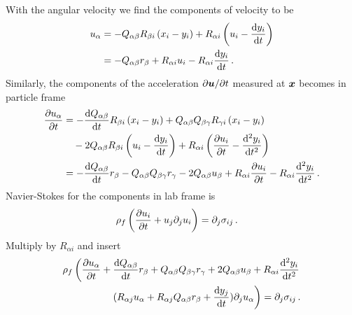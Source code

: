 \documentclass[thesis.tex]{subfiles}
\begin{document}
With the angular velocity we find the components of velocity to be
\begin{align}
    u_\alpha &= -Q_{\alpha \beta}R_{\beta i}\left(x_i - y_i\right) + R_{\alpha i}\left(u_i - \frac{\mathrm{d} y_i}{\mathrm{d} t}\right) \nonumber \\
    &= -Q_{\alpha \beta}r_\beta + R_{\alpha i}u_i - R_{\alpha i}\frac{\mathrm{d} y_i}{\mathrm{d} t}\,.
\end{align}
Similarly, the components of the acceleration $\partial \mbox{\boldmath$u$}/\partial t$ measured at $\mbox{\boldmath$x$}$ becomes in particle frame
\begin{align}
    \frac{\partial u_\alpha}{\partial t} &= -\frac{\mathrm{d} Q_{\alpha \beta}}{\mathrm{d} t}R_{\beta i}\left(x_i - y_i\right) + Q_{\alpha \beta}Q_{\beta \gamma}R_{\gamma i}\left(x_i - y_i\right) \nonumber\\
    &\quad- 2Q_{\alpha \beta}R_{\beta i}\left(u_i - \frac{\mathrm{d} y_i}{\mathrm{d} t}\right) + R_{\alpha i}\left(\frac{\partial u_i}{\partial t} - \frac{\mathrm{d}^2 y_i}{\mathrm{d} t^2}\right) \nonumber \\
    &= -\frac{\mathrm{d} Q_{\alpha \beta}}{\mathrm{d} t}r_\beta - Q_{\alpha \beta}Q_{\beta \gamma}r_\gamma - 2Q_{\alpha \beta}u_\beta + R_{\alpha i}\frac{\partial u_i}{\partial t} -R_{\alpha i}\frac{\mathrm{d}^2 y_i}{\mathrm{d} t^2}\,.
\end{align}
Navier-Stokes for the components in lab frame is
\begin{align}
    \rho_f\left(\frac{\partial u_i}{\partial t} + u_j \partial_j u_i\right) &= \partial_j \sigma_{ij}\,.
\end{align}
Multiply by $R_{\alpha i}$ and insert
\begin{align}
    \rho_f\left(\frac{\partial u_\alpha}{\partial t} + \frac{\mathrm{d} Q_{\alpha \beta}}{\mathrm{d} t}r_\beta + Q_{\alpha \beta}Q_{\beta \gamma}r_\gamma + 2Q_{\alpha \beta}u_\beta +R_{\alpha i}\frac{\mathrm{d}^2 y_i}{\mathrm{d} t^2}\right.\nonumber\\
    \left.\quad (R_{\alpha j}u_\alpha + R_{\alpha j}Q_{\alpha \beta}r_\beta + \frac{\mathrm{d} y_j}{\mathrm{d} t} ) \partial_j u_\alpha\right) = \partial_j \sigma_{ij}\,.    
\end{align}
\end{document}
